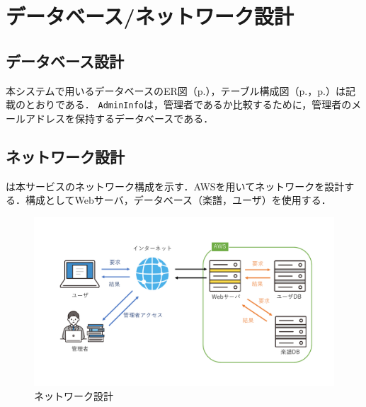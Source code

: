 \chapter{データベース/ネットワーク設計}
\section*{データベース設計}
本システムで用いるデータベースのER図（p.\pageref{fig:ER図}），テーブル構成図（p.\pageref{tableDesgin1}，p.\pageref{tableDesgin2}）は記載のとおりである．
\texttt{AdminInfo}は，管理者であるか比較するために，管理者のメールアドレスを保持するデータベースである．
\section*{ネットワーク設計}
は本サービスのネットワーク構成を示す．AWSを用いてネットワークを設計する．構成としてWebサーバ，データベース（楽譜，ユーザ）を使用する．
\begin{figure}[b]
	\centering
	\includegraphics[keepaspectratio,width=.8\textwidth]{db-nwDesign/networkDesign.pdf}
	\caption{ネットワーク設計}\label{fig:ネットワーク設計}
\end{figure}
